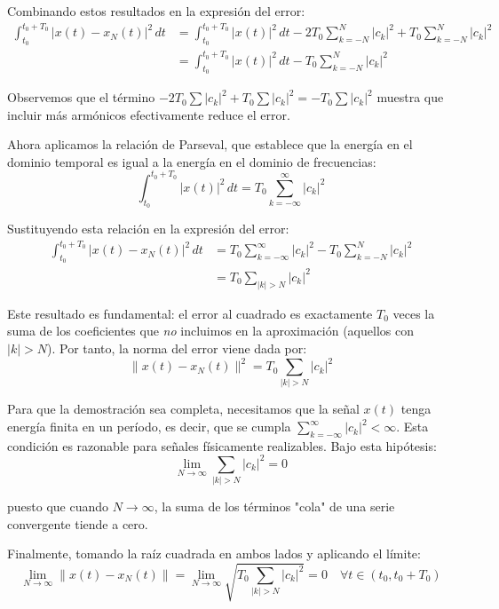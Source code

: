\documentclass[
  11pt,
  letterpaper,
   addpoints,
   answers
  ]{exam}
\begin{document}
\begin{questions}
\begin{solution}
Combinando estos resultados en la expresión del error:
\begin{align}
\int_{t_0}^{t_0+T_0} |x(t) - x_N(t)|^2 \, dt &= \int_{t_0}^{t_0+T_0} |x(t)|^2 \, dt - 2 T_0 \sum_{k=-N}^{N} |c_k|^2 + T_0 \sum_{k=-N}^{N} |c_k|^2 \\
&= \int_{t_0}^{t_0+T_0} |x(t)|^2 \, dt - T_0 \sum_{k=-N}^{N} |c_k|^2
\end{align}

Observemos que el término \(-2T_0\sum|c_k|^2 + T_0\sum|c_k|^2 = -T_0\sum|c_k|^2\) muestra que incluir más armónicos efectivamente reduce el error.

Ahora aplicamos la relación de Parseval, que establece que la energía en el dominio temporal es igual a la energía en el dominio de frecuencias:
\begin{equation}
\int_{t_0}^{t_0+T_0} |x(t)|^2 \, dt = T_0 \sum_{k=-\infty}^{\infty} |c_k|^2
\end{equation}

Sustituyendo esta relación en la expresión del error:
\begin{align}
\int_{t_0}^{t_0+T_0} |x(t) - x_N(t)|^2 \, dt &= T_0 \sum_{k=-\infty}^{\infty} |c_k|^2 - T_0 \sum_{k=-N}^{N} |c_k|^2 \\
&= T_0 \sum_{|k|>N} |c_k|^2
\end{align}

Este resultado es fundamental: el error al cuadrado es exactamente \(T_0\) veces la suma de los coeficientes que \textit{no} incluimos en la aproximación (aquellos con \(|k|>N\)). Por tanto, la norma del error viene dada por:
\begin{equation}
\| x(t) - x_N(t) \|^2 = T_0 \sum_{|k|>N} |c_k|^2
\end{equation}

Para que la demostración sea completa, necesitamos que la señal \(x(t)\) tenga energía finita en un período, es decir, que se cumpla \(\sum_{k=-\infty}^{\infty} |c_k|^2 < \infty\). Esta condición es razonable para señales físicamente realizables. Bajo esta hipótesis:
\begin{equation}
\lim_{N \to \infty} \sum_{|k|>N} |c_k|^2 = 0
\end{equation}

puesto que cuando \(N \to \infty\), la suma de los términos "cola" de una serie convergente tiende a cero.

Finalmente, tomando la raíz cuadrada en ambos lados y aplicando el límite:
\begin{equation}
\lim_{N \to \infty} \| x(t) - x_N(t) \| = \lim_{N \to \infty} \sqrt{T_0 \sum_{|k|>N} |c_k|^2} = 0 \quad \forall t \in (t_0, t_0+T_0)
\end{equation}


\end{solution}
\end{questions}
\end{document}
